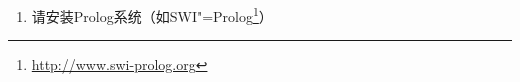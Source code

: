 {\begin{enumerate}
\eal
\ex 
\gll Der Mann hilft der Frau jetzt.\\
     \textsc{art}.\textsc{def}.\nom{} 男人 帮助 \textsc{art}.\textsc{def}.\dat{} 女人 现在\\
\ex 
\gll Der Mann hilft der Frau neben dem Bushäuschen.\\
     \textsc{art}.\textsc{def}.\nom{} 男人 帮助 \textsc{art}.\textsc{def}.\dat{} 女人 在……旁 \textsc{art}.\textsc{def} 公交车候车亭\\
\ex 
\gll Er gibt ihr das Buch jetzt.\\
     他.\nom{} 给 她.\dat{} \textsc{art}.\textsc{def}.\acc{} 书 现在\\
\ex 
\gll Er gibt ihr das Buch neben dem Bushäuschen.\\
     他.\nom{} 给 她.\dat{} \textsc{art}.\textsc{def}.\acc{} 书 在……旁 \textsc{art}.\textsc{def} 公交车候车亭\\
\ex 
\gll Er wartet jetzt auf ein Wunder.\\
     他.\nom{} 等 现在 \textsc{prep} 一 奇迹\\
\ex 
\gll Er wartet neben dem Bushäuschen auf ein Wunder.\\
      他.\nom{} 等 在……旁 \textsc{art}.\textsc{def}.\dat{} 公交车候车亭 \textsc{prep} 一 奇迹\\
\zl
\item 请安装Prolog系统（如SWI"=Prolog\footnote{%
\url{http://www.swi-prolog.org} 
}）

\end{enumerate}}
